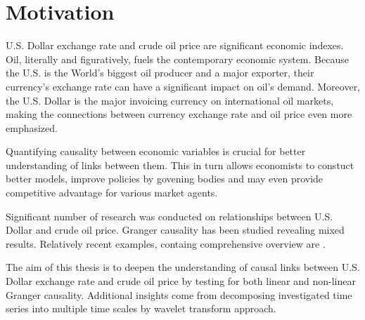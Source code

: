 \section{Motivation} \label{sec:motivation}

U.S. Dollar exchange rate and crude oil price are significant economic indexes.
Oil, literally and figuratively, fuels the contemporary economic system.
Because the U.S. is the World's biggest oil producer and a major exporter, their currency's exchange rate 
can have a significant impact on oil's demand. Moreover, the U.S. Dollar is the major invoicing currency
on international oil markets, making the connections between currency exchange rate and oil price even more
emphasized.

Quantifying causality between economic variables is crucial for better understanding of links between them.
This in turn allows economists to constuct better models, improve policies by govening bodies and may even 
provide competitive advantage for various market agents.

Significant number of research was conducted on relationships between U.S. Dollar and crude oil price.
Granger causality has been studied revealing mixed results. Relatively recent examples, containg comprehensive
overview are \cite{2010-oil-dollar, 2012-benhmad, 2017-oil-dollar}.

The aim of this thesis is to deepen the understanding of causal links between U.S. Dollar exchange rate
and crude oil price by testing for both linear and non-linear Granger causality.
Additional insights come from decomposing investigated time series into multiple time scales by wavelet
transform approach.
